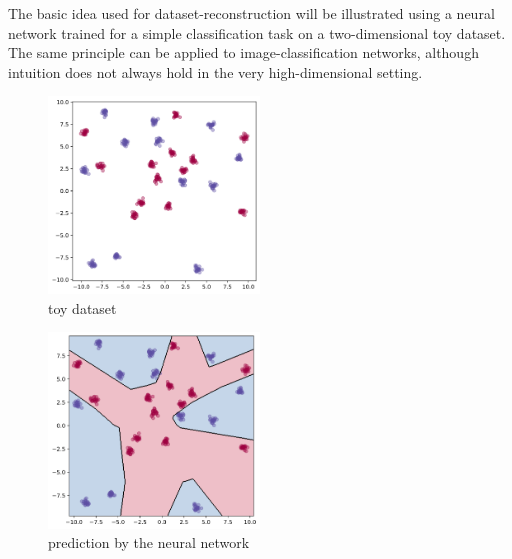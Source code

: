 \label{Chapter2} %


The basic idea used for dataset-reconstruction will be illustrated using a neural network trained for a simple classification task on a two-dimensional toy dataset. The same principle can be applied to image-classification networks, although intuition does not always hold in the very high-dimensional setting.

\begin{figure}
\centering
\includegraphics[width=0.5\textwidth]{Figures/toy_dataset.png}
\decoRule
\caption{toy dataset}
\label{fig:toy_dataset}
\end{figure}


\begin{figure}
\centering
\includegraphics[width=0.5\textwidth]{Figures/toy_dataset_contour.png}
\decoRule
\caption{prediction by the neural network}
\label{fig:toy_dataset_contour}
\end{figure}

